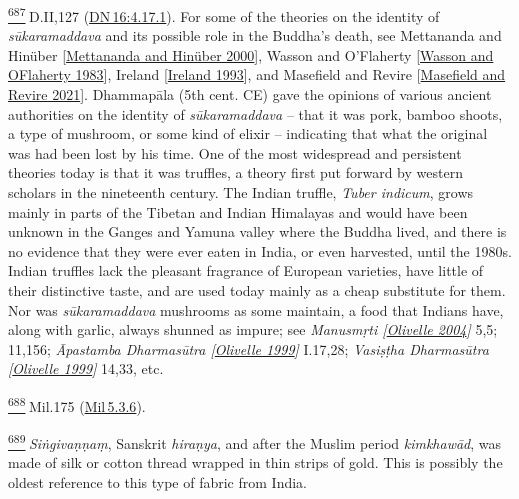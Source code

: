 \label{footprints_split_025.html_fn687}
\hyperref[footprints_split_017.htmlux5cux23fnref687]{\textsuperscript{687}} D.II,127
(\href{https://suttacentral.net/dn16/en/sujato\#4.17.1}{DN\,16:4.17.1}).
For some of the theories on the identity of \emph{sūkaramaddava} and its
possible role in the Buddha's death, see {Mettananda and Hinüber
{{[}\hyperref[footprints_split_022.htmlux5cux23Mettanandaux5cux2520andux5cux2520Hinuxfcberux5cux25202000]{Mettananda
and Hinüber 2000}{]}}}, {Wasson and O'Flaherty
{{[}\hyperref[footprints_split_022.htmlux5cux23Wassonux5cux2520andux5cux2520OFlahertyux5cux25201983]{Wasson
and OFlaherty 1983}{]}}}, {Ireland
{{[}\hyperref[footprints_split_022.htmlux5cux23Irelandux5cux25201993]{Ireland
1993}{]}}}, and {Masefield and Revire
{{[}\hyperref[footprints_split_022.htmlux5cux23Masefieldux5cux2520andux5cux2520Revireux5cux25202021]{Masefield
and Revire 2021}{]}}}. Dhammapāla (5{th} cent. CE) gave the opinions of
various ancient authorities on the identity of \emph{sūkaramaddava} --
that it was pork, bamboo shoots, a type of mushroom, or some kind of
elixir -- indicating that what the original was had been lost by his
time. One of the most widespread and persistent theories today is that
it was truffles, a theory first put forward by western scholars in the
nineteenth century. The Indian truffle, \emph{Tuber indicum}, grows
mainly in parts of the Tibetan and Indian Himalayas and would have been
unknown in the Ganges and Yamuna valley where the Buddha lived, and
there is no evidence that they were ever eaten in India, or even
harvested, until the 1980s. Indian truffles lack the pleasant fragrance
of European varieties, have little of their distinctive taste, and are
used today mainly as a cheap substitute for them. Nor was
\emph{sūkaramaddava} mushrooms as some maintain, a food that Indians
have, along with garlic, always shunned as impure; see \emph{{Manusmṛti
{{[}\hyperref[footprints_split_022.htmlux5cux23Olivelleux5cux25202004]{Olivelle
2004}{]}}}} 5,5; 11,156; \emph{{Āpastamba Dharmasūtra
{{[}\hyperref[footprints_split_022.htmlux5cux23Olivelleux5cux25201999]{Olivelle
1999}{]}}}} I.17,28; \emph{{Vasiṣṭha Dharmasūtra
{{[}\hyperref[footprints_split_022.htmlux5cux23Olivelleux5cux25201999]{Olivelle
1999}{]}}}} 14,33, etc.

\label{footprints_split_025.html_fn688}
\hyperref[footprints_split_017.htmlux5cux23fnref688]{\textsuperscript{688}} Mil.175
(\href{https://suttacentral.net/mil5.3.6}{Mil\,5.3.6}).

\label{footprints_split_025.html_fn689}
\hyperref[footprints_split_017.htmlux5cux23fnref689]{\textsuperscript{689}} \emph{Siṅgivaṇṇaṃ},
Sanskrit \emph{hiraṇya}, and after the Muslim period \emph{kimkhawād},
was made of silk or cotton thread wrapped in thin strips of gold. This
is possibly the oldest reference to this type of fabric from India.

